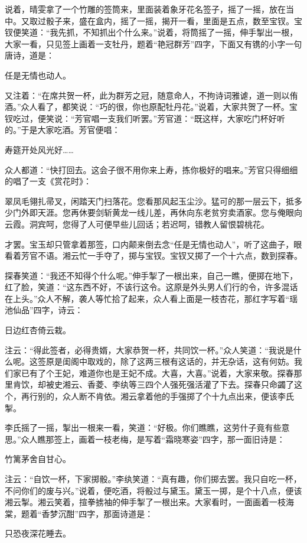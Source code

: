 说着，晴雯拿了一个竹雕的签筒来，里面装着象牙花名签子，摇了一摇，放在当中。又取过骰子来，盛在盒内，摇了一摇，揭开一看，里面是五点，数至宝钗。宝钗便笑道：“我先抓，不知抓出个什么来。”说着，将筒摇了一摇，伸手掣出一根，大家一看，只见签上画着一支牡丹，题着“艳冠群芳”四字，下面又有镌的小字一句唐诗，道是：

任是无情也动人。

又注着：“在席共贺一杯，此为群芳之冠，随意命人，不拘诗词雅谑，道一则以侑酒。”众人看了，都笑说：“巧的很，你也原配牡丹花。”说着，大家共贺了一杯。宝钗吃过，便笑说：“芳官唱一支我们听罢。”芳官道：“既这样，大家吃门杯好听的。”于是大家吃酒。芳官便唱：

寿筵开处风光好\ldots{}\ldots{}

众人都道：“快打回去。这会子很不用你来上寿，拣你极好的唱来。”芳官只得细细的唱了一支《赏花时》：

翠凤毛翎扎帚叉，闲踏天门扫落花。您看那风起玉尘沙。猛可的那一层云下，抵多少门外即天涯。您再休要剑斩黄龙一线儿差，再休向东老贫穷卖酒家。您与俺眼向云霞。洞宾呵，您得了人可便早些儿回话；若迟呵，错教人留恨碧桃花。

才罢。宝玉却只管拿着那签，口内颠来倒去念“任是无情也动人”，听了这曲子，眼看着芳官不语。湘云忙一手夺了，掷与宝钗。宝钗又掷了一个十六点，数到探春。

探春笑道：“我还不知得个什么呢。”伸手掣了一根出来，自己一瞧，便掷在地下，红了脸，笑道：“这东西不好，不该行这令。这原是外头男人们行的令，许多混话在上头。”众人不解，袭人等忙拾了起来，众人看上面是一枝杏花，那红字写着“瑶池仙品”四字，诗云：

日边红杏倚云栽。

注云：“得此签者，必得贵婿，大家恭贺一杯，共同饮一杯。”众人笑道：“我说是什么呢。这签原是闺阁中取戏的，除了这两三根有这话的，并无杂话，这有何妨。我们家已有了个王妃，难道你也是王妃不成。大喜，大喜。”说着，大家来敬。探春那里肯饮，却被史湘云、香菱、李纨等三四个人强死强活灌了下去。探春只命蠲了这个，再行别的，众人断不肯依。湘云拿着他的手强掷了个十九点出来，便该李氏掣。

李氏摇了一摇，掣出一根来一看，笑道：“好极。你们瞧瞧，这劳什子竟有些意思。”众人瞧那签上，画着一枝老梅，是写着“霜晓寒姿”四字，那一面旧诗是：

竹篱茅舍自甘心。

注云：“自饮一杯，下家掷骰。”李纨笑道：“真有趣，你们掷去罢。我只自吃一杯，不问你们的废与兴。”说着，便吃酒，将骰过与黛玉。黛玉一掷，是个十八点，便该湘云掣。湘云笑着，揎拳掳袖的伸手掣了一根出来。大家看时，一面画着一枝海棠，题着“香梦沉酣”四字，那面诗道是：

只恐夜深花睡去。

